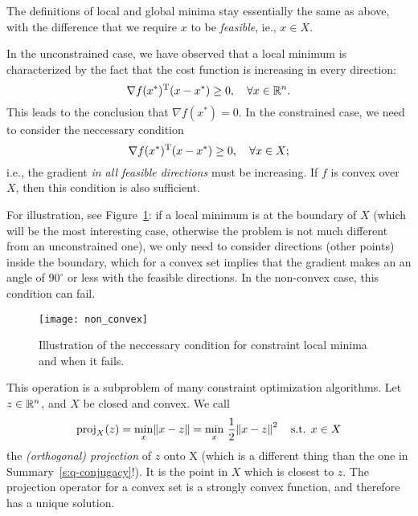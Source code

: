 \documentclass{article}
\begin{document}
The definitions of local and global minima stay essentially the same as above, with the difference
that we require \(x\) to be \emph{feasible}, ie., \(x \in X\).


\label{s:constrained-optimality}

In the unconstrained case, we have observed that a local minimum is characterized by the fact that
the cost function is increasing in every direction:
\begin{equation*}
  \nabla f(x^*)^{\mathrm{T}}(x - x^*) \geq 0, \quad\forall x \in \mathbb{R}^n.
\end{equation*}
This leads to the conclusion that \(\nabla f(x^*) = 0\). In the constrained case, we need to
consider the neccessary condition
\begin{equation*}
  \nabla f(x^*)^{\mathrm{T}}(x - x^*) \geq 0, \quad\forall x \in X;
\end{equation*}
i.e., the gradient \emph{in all feasible directions} must be increasing.  If \(f\) is convex
over \(X\), then this condition is also sufficient.

For illustration, see Figure~\ref{fig:non-convex}: if a local minimum is at the boundary of \(X\)
(which will be the most interesting case, otherwise the problem is not much different from an
unconstrained one), we only need to consider directions (other points) inside the boundary, which
for a convex set implies that the gradient makes an an angle of \(90^\circ\) or less with the
feasible directions.  In the non-convex case, this condition can fail.

\begin{figure}[H]
  \centering
  \texttt{[image: non\_convex]}
  \caption{Illustration of the neccessary condition for constraint local minima and when it
    fails.\label{fig:non-convex}}
\end{figure}


\label{s:projection-operator}

This operation is a subproblem of many constraint optimization algorithms.  Let \(z \in \mathbb{R}^n\), and
\(X\) be closed and convex.  We call
\begin{equation*}
  \proj_X(z) = \min_x \enVert{x - z}
  = \min_{x}\, \frac{1}{2}\enVert{x - z}^2 \quad\text{s.t. } x \in X
\end{equation*}
the \emph{(orthogonal) projection} of \(z\) onto X (which is a different thing than the one in
Summary~\ref{s:q-conjugacy}!).  It is the point in \(X\) which is closest to \(z\).  The projection
operator for a convex set is a strongly convex function, and therefore has a unique solution.
\end{document}
